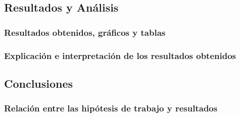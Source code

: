 \subsection{Resultados y Análisis}
\subsubsection*{Resultados obtenidos, gráficos y tablas}


\subsubsection*{Explicación e interpretación de los resultados obtenidos}


\subsection{Conclusiones}
\subsubsection*{Relación entre las hipótesis de trabajo y resultados}